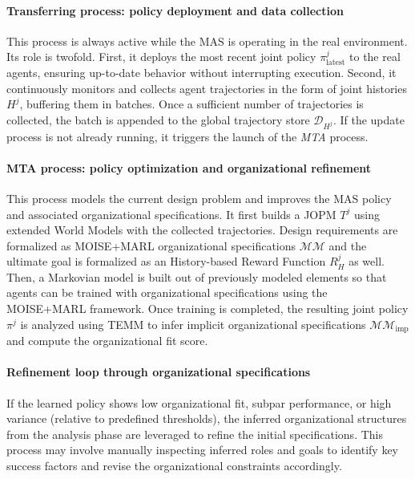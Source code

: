 \documentclass[pdflatex,sn-mathphys-num]{sn-jnl}%
\theoremstyle{thmstyleone}%
\theoremstyle{thmstyletwo}%
\theoremstyle{thmstylethree}%
\begin{document}
\paragraph{Transferring process: policy deployment and data collection}

This process is always active while the MAS is operating in the real environment. Its role is twofold. First, it deploys the most recent joint policy $\pi^j_{\text{latest}}$ to the real agents, ensuring up-to-date behavior without interrupting execution. Second, it continuously monitors and collects agent trajectories in the form of joint histories $H^j$, buffering them in batches. Once a sufficient number of trajectories is collected, the batch is appended to the global trajectory store $\mathcal{D}_{H^j}$. If the update process is not already running, it triggers the launch of the \textit{MTA} process.

\paragraph{MTA process: policy optimization and organizational refinement}

This process models the current design problem and improves the MAS policy and associated organizational specifications. It first builds a JOPM $T^j$ using extended World Models with the collected trajectories. Design requirements are formalized as MOISE+MARL organizational specifications $\mathcal{MM}$ and the ultimate goal is formalized as an History-based Reward Function $R^j_H$ as well.
%
Then, a Markovian model is built out of previously modeled elements so that agents can be trained with organizational specifications using the MOISE+MARL framework. Once training is completed, the resulting joint policy $\pi^j$ is analyzed using TEMM to infer implicit organizational specifications $\mathcal{MM}_{\text{imp}}$ and compute the organizational fit score.

\paragraph{Refinement loop through organizational specifications}

If the learned policy shows low organizational fit, subpar performance, or high variance (relative to predefined thresholds), the inferred organizational structures from the analysis phase are leveraged to refine the initial specifications. This process may involve manually inspecting inferred roles and goals to identify key success factors and revise the organizational constraints accordingly.
\end{document}
